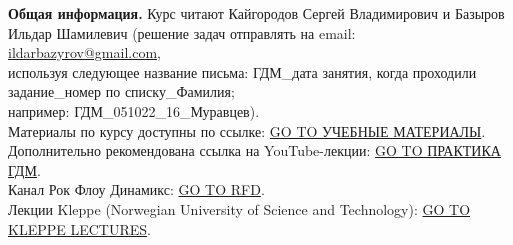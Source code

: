 \documentclass[main.tex]{subfiles}
\begin{document}
\textbf{Общая информация.} Курс читают Кайгородов Сергей Владимирович и Базыров Ильдар Шамилевич (решение задач отправлять на email: \href{mailto:ildarbazyrov@gmail.com}{ildarbazyrov@gmail.com},\\
используя следующее название письма: ГДМ\_дата занятия, когда проходили задание\_номер по списку\_Фамилия;\\
например: ГДМ\_051022\_16\_Муравцев).\\
Материалы по курсу доступны по ссылке: \href{https://csspbstu-my.sharepoint.com/:f:/g/personal/muravtsev_aa_edu_spbstu_ru/Epiacj6WFMBHqIF6E3YQgCMB7yi5NAA1ycqFLqrTZMhJ4w?e=i2agP0}{GO TO УЧЕБНЫЕ МАТЕРИАЛЫ}.\\
Дополнительно рекомендована ссылка на YouTube-лекции: \href{https://youtube.com/playlist?list=PLDW64ZxU0_y5QCvZ048VptkQPoKJZPdEc}{GO TO ПРАКТИКА ГДМ}.\\
Канал Рок Флоу Динамикс: \href{https://www.youtube.com/c/RockFlowDynamics/playlists}{GO TO RFD}.\\
Лекции Kleppe (Norwegian University of Science and Technology): \href{http://www.ipt.ntnu.no/~kleppe/TPG4160/}{GO TO KLEPPE LECTURES}.
\end{document}
